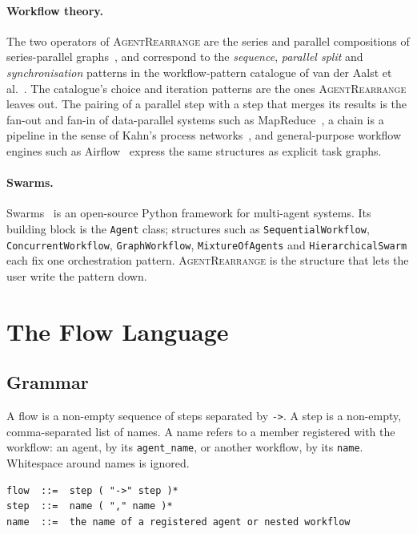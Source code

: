 \documentclass[11pt]{article}
\newcommand{\code}[1]{\texttt{#1}}
\newcommand{\AR}{\textsc{AgentRearrange}}
\begin{document}
\paragraph{Workflow theory.}
The two operators of \AR{} are the series and parallel compositions of series-parallel graphs~\cite{sp_graphs}, and correspond to the \emph{sequence}, \emph{parallel split} and \emph{synchronisation} patterns in the workflow-pattern catalogue of van der Aalst et al.~\cite{workflow_patterns}. The catalogue's choice and iteration patterns are the ones \AR{} leaves out. The pairing of a parallel step with a step that merges its results is the fan-out and fan-in of data-parallel systems such as MapReduce~\cite{mapreduce}, a chain is a pipeline in the sense of Kahn's process networks~\cite{kahn}, and general-purpose workflow engines such as Airflow~\cite{airflow} express the same structures as explicit task graphs.

\paragraph{Swarms.}
Swarms~\cite{swarms} is an open-source Python framework for multi-agent systems. Its building block is the \code{Agent} class; structures such as \code{SequentialWorkflow}, \code{ConcurrentWorkflow}, \code{GraphWorkflow}, \code{MixtureOfAgents} and \code{HierarchicalSwarm} each fix one orchestration pattern. \AR{} is the structure that lets the user write the pattern down.

\section{The Flow Language}
\label{sec:language}

\subsection{Grammar}

A flow is a non-empty sequence of steps separated by \code{->}. A step is a non-empty, comma-separated list of names. A name refers to a member registered with the workflow: an agent, by its \code{agent\_name}, or another workflow, by its \code{name}. Whitespace around names is ignored.

\begin{lstlisting}[style=plain]
flow  ::=  step ( "->" step )*
step  ::=  name ( "," name )*
name  ::=  the name of a registered agent or nested workflow
\end{lstlisting}
\end{document}
